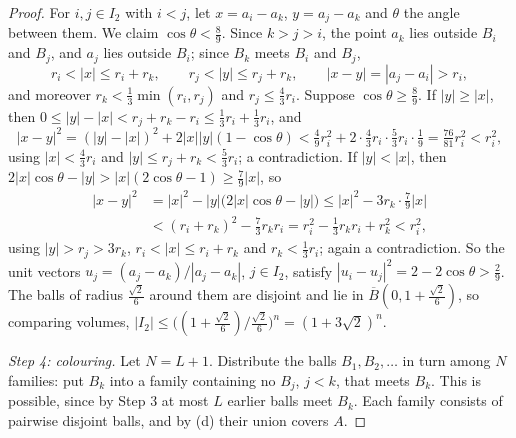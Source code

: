 \begin{proof}
For $i, j \in I_2$ with $i < j$, let $x = a_i - a_k$, $y = a_j - a_k$ and $\theta$ the angle between them. We claim $\cos\theta < \frac89$. Since $k > j > i$, the point $a_k$ lies outside $B_i$ and $B_j$, and $a_j$
lies outside $B_i$; since $B_k$ meets $B_i$ and $B_j$,
\[
r_i < |x| \leq r_i + r_k, \qquad r_j < |y| \leq r_j + r_k, \qquad |x - y| = |a_j - a_i| > r_i,
\]
and moreover $r_k < \frac13\min(r_i, r_j)$ and $r_j \leq \frac43r_i$. Suppose $\cos\theta \geq \frac89$. If $|y| \geq |x|$, then $0 \leq |y| - |x| < r_j + r_k - r_i \leq \frac13r_i + \frac13r_i$, and
\[
|x - y|^2 = (|y| - |x|)^2 + 2|x||y|(1 - \cos\theta) < \tfrac49r_i^2 + 2\cdot\tfrac43r_i\cdot\tfrac53r_i\cdot\tfrac19 = \tfrac{76}{81}r_i^2 < r_i^2,
\]
using $|x| < \frac43r_i$ and $|y| \leq r_j + r_k < \frac53r_i$; a contradiction. If $|y| < |x|$, then $2|x|\cos\theta - |y| > |x|(2\cos\theta - 1) \geq \frac79|x|$, so
\[\begin{aligned}
|x - y|^2 &= |x|^2 - |y|\bigl(2|x|\cos\theta - |y|\bigr) \leq |x|^2 - 3r_k\cdot\tfrac79|x| \\
&< (r_i + r_k)^2 - \tfrac73r_kr_i = r_i^2 - \tfrac13r_kr_i + r_k^2 < r_i^2,
\end{aligned}\]
using $|y| > r_j > 3r_k$, $r_i < |x| \leq r_i + r_k$ and $r_k < \frac13r_i$; again a contradiction. So the unit vectors $u_j = (a_j - a_k)/|a_j - a_k|$, $j \in I_2$, satisfy
$|u_i - u_j|^2 = 2 - 2\cos\theta > \frac29$. The balls of radius $\frac{\sqrt2}6$ around them are disjoint and lie in $\overline{B}(0, 1 + \frac{\sqrt2}6)$, so comparing volumes,
$|I_2| \leq \bigl((1 + \frac{\sqrt2}6)/\frac{\sqrt2}6\bigr)^n = (1 + 3\sqrt2)^n$.

\emph{Step 4: colouring.} Let $N = L + 1$. Distribute the balls $B_1, B_2, \ldots$ in turn among $N$ families: put $B_k$ into a family containing no $B_j$, $j < k$, that meets $B_k$. This is possible,
since by Step 3 at most $L$ earlier balls meet $B_k$. Each family consists of pairwise disjoint balls, and by (d) their union covers $A$.
\end{proof}

